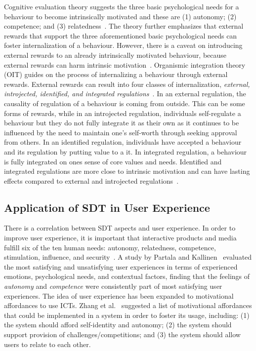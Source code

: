 \documentclass{sig-alternate}
\begin{document}
Cognitive evaluation theory suggests the three basic psychological needs for a behaviour to become intrinsically motivated and these are (1) autonomy; (2) competence; and (3) relatedness~\cite{deci1985:intrinsic}. 
The theory further emphasizes that external rewards that support the three aforementioned basic psychological needs can foster internalization of a behaviour. However, there is a caveat on introducing external rewards to an already intrinsically motivated behaviour, because external rewards can harm intrinsic motivation~\cite{ryan2000:self}. Organismic integration theory (OIT) guides on the process of internalizing a behaviour through external rewards. External rewards can result into four classes of internalization, \emph{external, introjected, identified, and integrated regulations}~\cite{ryan2000:self}. In an external regulation, the causality of regulation of a behaviour is coming from outside. This can be some forms of rewards, while in an introjected regulation, individuals self-regulate a behaviour but they do not fully integrate it as their own as it continues to be influenced by the need to maintain one's self-worth through seeking approval from others. In an identified  regulation, individuals have accepted a behaviour and its regulation by putting value to a it. In integrated regulation, a behaviour is fully integrated on ones sense of core values and needs. Identified and integrated regulations are more close to intrinsic motivation and can have lasting effects compared to external and introjected regulations~\cite{ryan2000intrinsic}. 

\subsection{Application of SDT in User Experience}
There is a correlation between SDT aspects and user experience. In order to improve user experience, it is important that interactive products and media fulfill six of the ten human needs: autonomy, relatedness, competence, stimulation, influence, and security~\cite{wiklund2009:needs}. A study by Partala and Kallinen~\cite{partala2012:understanding} evaluated the most satisfying and unsatisfying user experiences in terms of experienced emotions, psychological needs, and contextual factors, finding that the feelings of \emph{autonomy} and \emph{competence} were consistently part of most satisfying user experiences. The idea of user experience has been expanded to motivational affordances to use ICTs. Zhang et al.~\cite{zhang2008:motivational} suggested a list of motivational affordances that could be implemented in a system in order to foster its usage, including: (1) the system should afford self-identity and autonomy; (2) the system should support provision of challenges/competitions; and (3) the system should allow users to relate to each other.
\end{document}
